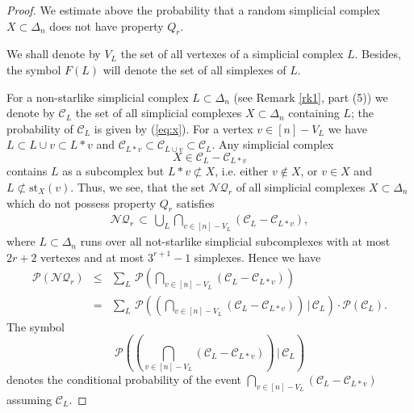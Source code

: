 \documentclass[11pt,twoside, reqno]{amsart}
\theoremstyle{plain}
\theoremstyle{definition}
\newcommand{\st}{\textrm{st}}
\begin{document}
\begin{proof} We estimate above the probability that a random simplicial complex $X\subset \Delta_n$ does not have property $Q_r$.

We shall denote by $V_L$ the set of all vertexes of a simplicial complex $L$. Besides, the symbol $F(L)$ will denote the set of all simplexes of $L$. 

For a non-starlike simplicial complex $L\subset \Delta_n$ (see Remark \ref{rk1}, part (5)) we denote by $\mathcal C_L$ the set of all simplicial complexes $X \subset \Delta_n$ containing $L$; the probability 
of $\mathcal C_L$ is given by (\ref{eq:x}). For a vertex $v\in [n]-V_L$ we have $L\subset L\cup v\subset L\ast v$ and 
$ {\mathcal C}_{L\ast v}\subset \mathcal C_{L\cup v}\subset {\mathcal C}_L$. 
Any simplicial complex $$X\in \mathcal C_{L}- \mathcal C_{L\ast v}$$ contains $L$ as a subcomplex but $L\ast v\not\subset X$, i.e. either $v\notin X$, or $v\in X$ and $L\not\subset \st_X(v)$. 
Thus, we see, that the set ${\mathcal {NQ}}_r$ of all simplicial complexes $X\subset \Delta_n$ which do not possess property $Q_r$ satisfies
\begin{eqnarray*}\label{eq:noqr}
{\mathcal {NQ}}_r \, %
\subset  \, 
\bigcup_L \bigcap_{v\in [n]-V_L}\left(\mathcal C_{L}-\mathcal C_{L\ast v}\right),
\end{eqnarray*}
where $L\subset \Delta_n$ runs over all not-starlike simplicial subcomplexes with at most $ 2r+2$ vertexes and at most $3^{r+1}-1$ simplexes. 
Hence we have
\begin{eqnarray}\label{eq:7}
\mathcal P(\mathcal {NQ}_r) &\le& 
\sum_L \, \mathcal P\left(\bigcap_{v\in [n]-V_L}(\mathcal C_{L}-\mathcal C_{L\ast v})\right) \nonumber\\ 
&=&
\sum_L \, \mathcal P\left(\left(\bigcap_{v\in [n]-V_L}(\mathcal C_{L}-\mathcal C_{L\ast v})\right)\, \big|\, \mathcal C_L\right)\cdot \mathcal P(\mathcal C_L).
\end{eqnarray}
The symbol $$\mathcal P\left(\left(\bigcap_{v\in [n]-V_L}(\mathcal C_{L}-\mathcal C_{L\ast v})\right)\, |\, \mathcal C_L\right)$$ denotes the conditional probability
of the event 
$\bigcap_{v\in [n]-V_L}(\mathcal C_{L}-\mathcal C_{L\ast v})$ assuming $\mathcal C_L$. 


\end{proof}
\end{document}
